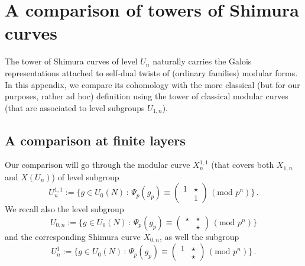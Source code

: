 \documentclass{amsart}
\numberwithin{equation}{section}
\begin{document}
\appendix




\section{A comparison of towers of Shimura curves}
\label{sec:comparison_of_towers}
The tower of Shimura curves of level $U_n$ naturally carries the Galois representations attached to self-dual twists of (ordinary families) modular forms. In this appendix, we compare its cohomology with the more classical (but for our purposes, rather ad hoc) definition using the tower of classical modular curves (that are associated to level subgroups $U_{1,n}$).

    \subsection{A comparison at finite layers}\label{subsection_2025_07_03_1620} Our comparison will go through the modular curve $X^{1,1}_n$ (that covers both $X_{1,n}$ and $X(U_n)$) of level subgroup 
$$U^{1,1}_{n}:=\{ g \in U_0(N) \,:\, \Psi_p(g_p) \equiv \left( \begin{smallmatrix} 1& \star  \\  & 1 \end{smallmatrix}\right)\, (\text{mod } p^n)\}\,.$$
We recall also the level subgroup
$$U_{0,n}:=\{ g \in U_0(N) \,:\, \Psi_p(g_p) \equiv \left( \begin{smallmatrix} \star& \star  \\  & \star \end{smallmatrix}\right)\, (\text{mod } p^n)\}$$
and the corresponding Shimura curve $X_{0,n}$, as well the subgroup
$$U_{n}^{1}:=\{ g \in U_0(N) \,:\, \Psi_p(g_p) \equiv \left( \begin{smallmatrix} 1& \star  \\  & \star \end{smallmatrix}\right)\, (\text{mod } p^n)\}\,.$$
\end{document}
